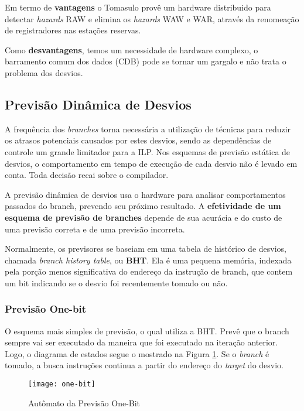 Em termo de \textbf{vantagens} o Tomasulo provê um hardware distribuido para detectar \textit{hazards} RAW e elimina os \textit{hazards} WAW e WAR, através da renomeação de registradores nas estações reservas.

Como \textbf{desvantagens}, temos um necessidade de hardware complexo, o barramento comum dos dados (CDB) pode se tornar um gargalo e não trata o problema dos desvios.






\subsection{Previsão Dinâmica de Desvios}
A frequência dos \textit{branches} torna necessária a utilização de técnicas para reduzir os atrasos potenciais causados por estes desvios, sendo as dependências de controle um grande limitador para a ILP. Nos esquemas de previsão estática de desvios, o comportamento em tempo de execução de cada desvio não é levado em conta. Toda decisão recai sobre o compilador.

A previsão dinâmica de desvios usa o hardware para analisar comportamentos
passados do branch, prevendo seu próximo resultado. A \textbf{efetividade de um esquema de previsão de branches} depende de sua acurácia e do custo de uma previsão correta e de uma previsão incorreta.

Normalmente, os previsores se baseiam em uma tabela de histórico de desvios, chamada \textit{branch history table}, ou \textbf{BHT}. Ela é uma pequena memória, indexada pela porção menos significativa do endereço da instrução de branch, que contem um bit indicando se o desvio foi recentemente tomado ou não.


\subsubsection{Previsão One-bit}
O esquema mais simples de previsão, o qual utiliza a BHT. Prevê que o branch sempre vai ser executado da maneira que foi executado na iteração anterior. Logo, o diagrama de estados segue o mostrado na Figura \ref{fig:one-bit}. Se o \textit{branch} é tomado, a busca instruções continua a partir do endereço do \textit{target} do desvio.

\begin{figure}[ht]
  \centering
  \texttt{[image: one-bit]}
  \caption{Autômato da Previsão One-Bit}
  \label{fig:one-bit}
\end{figure}

